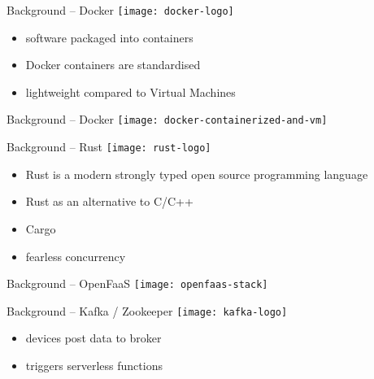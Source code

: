 \begin{frame}{Background -- Docker}
  \texttt{[image: docker-logo]}

  \vspace*{1.5em}

  \begin{itemize}
    \item software packaged into containers
    \item Docker containers are standardised
    \item lightweight compared to Virtual Machines
  \end{itemize}
\end{frame}

\begin{frame}{Background -- Docker}
  \vfill
  \texttt{[image: docker-containerized-and-vm]}
\end{frame}

\begin{frame}{Background -- Rust}
  \texttt{[image: rust-logo]}

  \vspace*{1.5em}

  \begin{itemize}
    \item Rust is a modern strongly typed open source programming language
    \item Rust as an alternative to C/C++
    \item Cargo
    \item fearless concurrency
  \end{itemize}
\end{frame}

\begin{frame}{Background -- OpenFaaS}
  \texttt{[image: openfaas-stack]}
\end{frame}

\begin{frame}{Background -- Kafka / Zookeeper}
  \texttt{[image: kafka-logo]}

  \vspace*{1.5em}

  \begin{itemize}
    \item devices post data to broker
    \item triggers serverless functions
  \end{itemize}
\end{frame}

